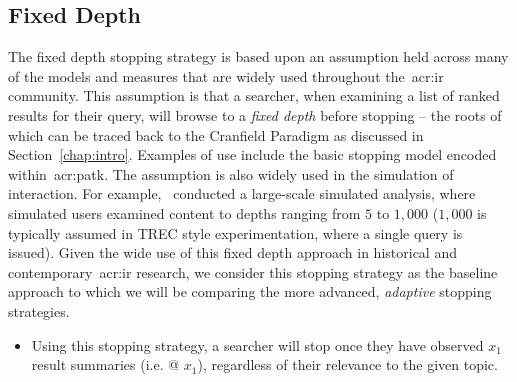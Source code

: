 \subsection{Fixed Depth}
The fixed depth stopping strategy is based upon an assumption held across many of the models and measures that are widely used throughout the~\gls{acr:ir} community. This assumption is that a searcher, when examining a list of ranked results for their query, will browse to a \emph{fixed depth} before stopping -- the roots of which can be traced back to the Cranfield Paradigm as discussed in Section~\ref{chap:intro}. Examples of use include the basic stopping model encoded within~\gls{acr:patk}. The assumption is also widely used in the simulation of interaction. For example,~\cite{azzopardi2011economics} conducted a large-scale simulated analysis, where simulated users examined content to depths ranging from $5$ to $1,000$ ($1,000$ is typically assumed in TREC style experimentation, where a single query is issued). Given the wide use of this fixed depth approach in historical and contemporary~\gls{acr:ir} research, we consider this stopping strategy as the baseline approach to which we will be comparing the more advanced, \emph{adaptive} stopping strategies.

\begin{itemize}
    
    \item[]{} Using this stopping strategy, a searcher will stop once they have observed $x_1$ result summaries (i.e.  @ $x_1$), regardless of their relevance to the given topic.
    
\end{itemize}

